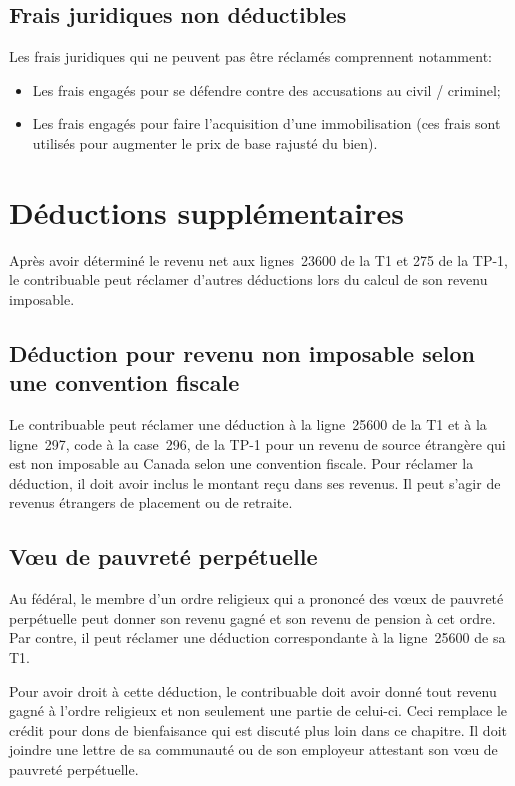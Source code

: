 \subsection{Frais juridiques non déductibles}
Les frais juridiques qui ne peuvent pas être réclamés comprennent notamment:
\begin{itemize}
	\item Les frais engagés pour se défendre contre des accusations au civil / criminel;
	\item Les frais engagés pour faire l'acquisition d'une immobilisation (ces frais sont utilisés pour augmenter le prix de base rajusté du bien).
\end{itemize}



\section{Déductions supplémentaires}
\begin{intro}
	Après avoir déterminé le revenu net aux lignes~23600 de la T1 et 275 de la TP-1, le contribuable peut réclamer d'autres déductions lors du calcul de son revenu imposable.
\end{intro}


\subsection{Déduction pour revenu non imposable selon une convention fiscale}
Le contribuable peut réclamer une déduction à la ligne~25600 de la T1 et à la ligne~297, code  \fg{} à la case~296, de la TP-1 pour un revenu de source étrangère qui est non imposable au Canada selon une convention fiscale. Pour réclamer la déduction, il doit avoir inclus le montant reçu dans ses revenus. Il peut s'agir de revenus étrangers de placement ou de retraite.


\subsection{Vœu de pauvreté perpétuelle}
Au fédéral, le membre d'un ordre religieux qui a prononcé des vœux de pauvreté perpétuelle peut donner son revenu gagné et son revenu de pension à cet ordre. Par contre, il peut réclamer une déduction correspondante à la ligne~25600 de sa T1.

Pour avoir droit à cette déduction, le contribuable doit avoir donné tout revenu gagné à l'ordre religieux et non seulement une partie de celui-ci. Ceci remplace le crédit pour dons de bienfaisance qui est discuté plus loin dans ce chapitre. Il doit joindre une lettre de sa communauté ou de son employeur attestant son vœu de pauvreté perpétuelle. 

